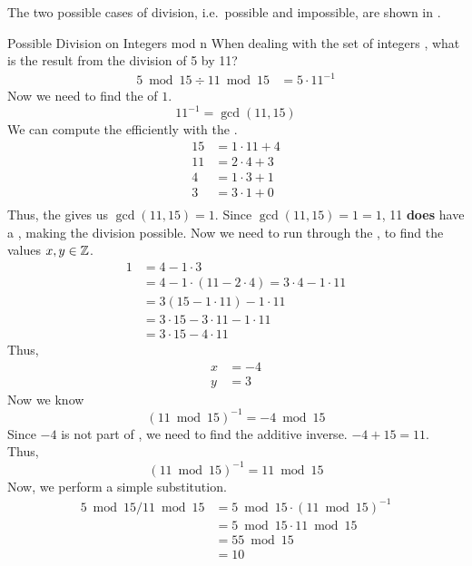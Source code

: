 The two possible cases of division, i.e.\ possible and impossible, are shown in .

\begin{example}[]{Possible Division on Integers mod n}
  When dealing with the set of integers , what is the result from the division of 5 by 11?
  \tcblower{}
  \begin{align*}
    5 \bmod 15 \div 11 \bmod 15 &= 5 \cdot 11^{-1}
  \end{align*}
  Now we need to find the  of $1$.
  \begin{equation*}
    11^{-1} = \gcd(11, 15)
  \end{equation*}
  We can compute the  efficiently with the .
  \begin{align*}
    15 &= 1 \cdot 11 + 4 \\
    11 &= 2 \cdot 4 + 3 \\
    4 &= 1 \cdot 3 + 1 \\
    3 &= 3 \cdot 1 + 0 \\
  \end{align*}
  Thus, the  gives us $\gcd(11, 15) = 1$.
  Since $\gcd(11, 15) = 1 = 1$, 11 \textbf{does} have a , making the division possible.
  Now we need to run through the , to find the values $x, y \in \operatorname{\mathbb{Z}}$.
  \begin{align*}
    1 &= 4 - 1 \cdot 3 \\
      &= 4 - 1 \cdot (11 - 2 \cdot 4) = 3 \cdot 4 - 1 \cdot 11 \\
      &= 3 (15 - 1 \cdot 11) - 1 \cdot 11 \\
      &= 3 \cdot 15 - 3 \cdot 11 - 1 \cdot 11 \\
      &= 3 \cdot 15 - 4 \cdot 11
  \end{align*}
  Thus,
  \begin{align*}
    x &= -4 \\
    y &= 3
  \end{align*}
  Now we know
  \begin{equation*}
    {(11 \bmod 15)}^{-1} = -4 \bmod 15
  \end{equation*}
  Since $-4$ is not part of , we need to find the additive inverse.
  $-4 + 15 = 11$.
  Thus,
  \begin{equation*}
    {(11 \bmod 15)}^{-1} = 11 \bmod 15
  \end{equation*}
  Now, we perform a simple substitution.
  \begin{align*}
    5 \bmod 15 / 11 \bmod 15 &= 5 \bmod 15 \cdot {(11 \bmod 15)}^{-1} \\
                             &= 5 \bmod 15 \cdot 11 \bmod 15 \\
                             &= 55 \bmod 15 \\
                             &= 10
  \end{align*}


\end{example}
